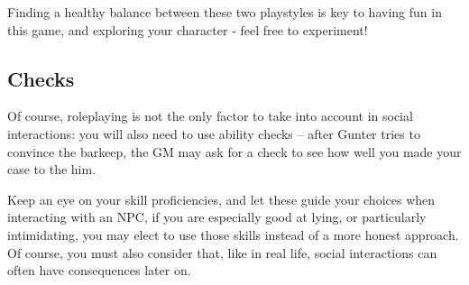 Finding a healthy balance between these two playstyles is key to having fun in this game, and exploring your character - feel free to experiment!

\subsection{Checks}

Of course, roleplaying is not the only factor to take into account in social interactions: you will also need to use ability checks -- after Gunter tries to convince the barkeep, the GM may ask for a  check to see how well you made your case to the him.

Keep an eye on your skill proficiencies, and let these guide your choices when interacting with an NPC, if you are especially good at lying, or particularly intimidating, you may elect to use those skills instead of a more honest approach. Of course, you must also consider that, like in real life, social interactions can often have consequences later on. 

